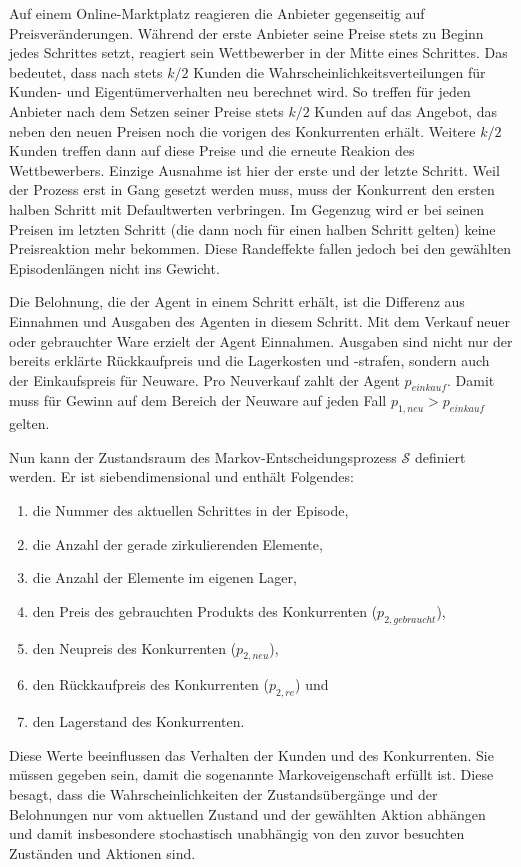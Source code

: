 Auf einem Online-Marktplatz reagieren die Anbieter gegenseitig auf Preisveränderungen.
Während der erste Anbieter seine Preise stets zu Beginn jedes Schrittes setzt, reagiert sein Wettbewerber in der Mitte eines Schrittes.
Das bedeutet, dass nach stets $k/2$ Kunden die Wahrscheinlichkeitsverteilungen für Kunden- und Eigentümerverhalten neu berechnet wird.
So treffen für jeden Anbieter nach dem Setzen seiner Preise stets $k/2$ Kunden auf das Angebot, das neben den neuen Preisen noch die vorigen des Konkurrenten erhält.
Weitere $k/2$ Kunden treffen dann auf diese Preise und die erneute Reakion des Wettbewerbers.
Einzige Ausnahme ist hier der erste und der letzte Schritt.
Weil der Prozess erst in Gang gesetzt werden muss, muss der Konkurrent den ersten halben Schritt mit Defaultwerten verbringen.
Im Gegenzug wird er bei seinen Preisen im letzten Schritt (die dann noch für einen halben Schritt gelten) keine Preisreaktion mehr bekommen.
Diese Randeffekte fallen jedoch bei den gewählten Episodenlängen nicht ins Gewicht.

Die Belohnung, die der Agent in einem Schritt erhält, ist die Differenz aus Einnahmen und Ausgaben des Agenten in diesem Schritt.
Mit dem Verkauf neuer oder gebrauchter Ware erzielt der Agent Einnahmen.
Ausgaben sind nicht nur der bereits erklärte Rückkaufpreis und die Lagerkosten und -strafen, sondern auch der Einkaufspreis für Neuware.
Pro Neuverkauf zahlt der Agent $p_{einkauf}$.
Damit muss für Gewinn auf dem Bereich der Neuware auf jeden Fall $p_{1, neu} > p_{einkauf}$ gelten.

Nun kann der Zustandsraum des Markov-Entscheidungsprozess $\mathcal{S}$ definiert werden.
Er ist siebendimensional und enthält Folgendes:
\begin{enumerate}
	\item die Nummer des aktuellen Schrittes in der Episode,
	\item die Anzahl der gerade zirkulierenden Elemente,
	\item die Anzahl der Elemente im eigenen Lager,
	\item den Preis des gebrauchten Produkts des Konkurrenten ($p_{2, gebraucht}$),
	\item den Neupreis des Konkurrenten ($p_{2, neu}$),
	\item den Rückkaufpreis des Konkurrenten ($p_{2, re}$) und
	\item den Lagerstand des Konkurrenten.
\end{enumerate}
Diese Werte beeinflussen das Verhalten der Kunden und des Konkurrenten.
Sie müssen gegeben sein, damit die sogenannte Markoveigenschaft erfüllt ist.
Diese besagt, dass die Wahrscheinlichkeiten der Zustandsübergänge und der Belohnungen nur vom aktuellen Zustand und der gewählten Aktion abhängen und damit insbesondere stochastisch unabhängig von den zuvor besuchten Zuständen und Aktionen sind.

